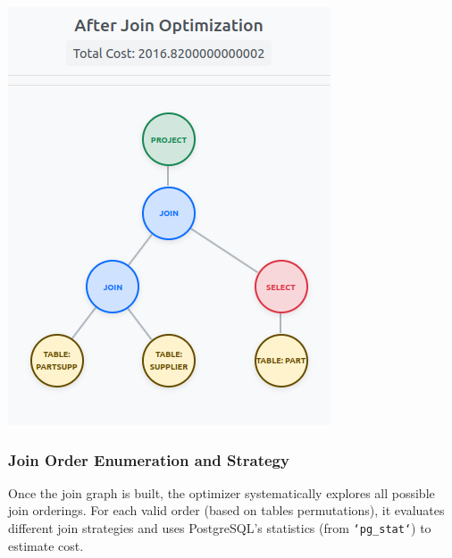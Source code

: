 \documentclass[12pt]{article}
\begin{document}
\begin{table}[h]
\begin{minipage}[t]{0.48\textwidth}
    \includegraphics[width=\textwidth]{images/join_ex_after.png}
  \end{minipage}
\end{table}

\subsubsection*{Join Order Enumeration and Strategy}

Once the join graph is built, the optimizer systematically explores all possible join orderings. For each valid order (based on tables permutations), it evaluates different join strategies and uses PostgreSQL’s statistics (from \texttt{`pg\_stat`}) to estimate cost.
\end{document}
